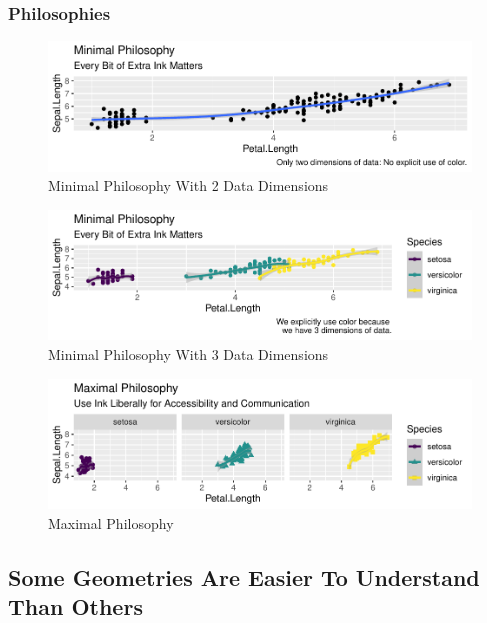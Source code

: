 \documentclass[
]{article}
\begin{document}
\hypertarget{philosophies}{%
\subsubsection{Philosophies}\label{philosophies}}

\begin{figure}
\centering
\includegraphics{design_files/figure-latex/unnamed-chunk-12-1.pdf}
\caption{Minimal Philosophy With 2 Data Dimensions}
\end{figure}

\begin{figure}
\centering
\includegraphics{design_files/figure-latex/unnamed-chunk-13-1.pdf}
\caption{Minimal Philosophy With 3 Data Dimensions}
\end{figure}

\begin{figure}
\centering
\includegraphics{design_files/figure-latex/unnamed-chunk-14-1.pdf}
\caption{Maximal Philosophy}
\end{figure}

\hypertarget{some-geometries-are-easier-to-understand-than-others}{%
\subsection{Some Geometries Are Easier To Understand Than
Others}\label{some-geometries-are-easier-to-understand-than-others}}
\end{document}
